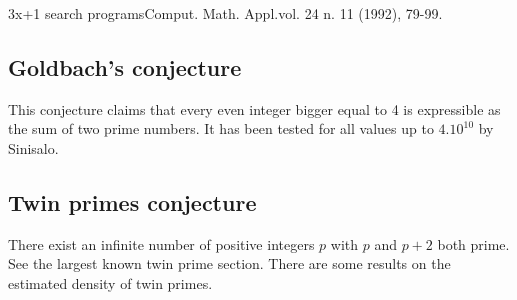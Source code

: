 
 {3x+1 search
  programs}{Comput. Math. Appl.}{vol. 24 n. 11 (1992), 79-99.}

\subsection{Goldbach's conjecture}

This conjecture claims that every even integer bigger equal to 4 is
expressible as the sum of two prime numbers.  It has been tested for all
values up to $4.10^{10}$ by Sinisalo.

%
%
%


\subsection{Twin primes conjecture}

There exist an infinite number of positive integers $p$ with $p$ and
$p+2$ both prime. See the largest known twin prime section. There are
some results on the estimated density of twin primes.
